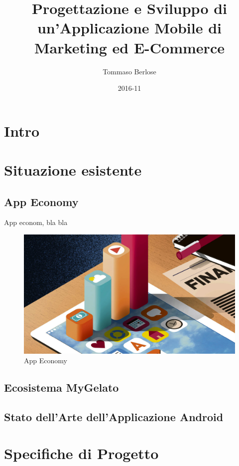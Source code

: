 \documentclass{article}
\title{Progettazione e Sviluppo di un'Applicazione Mobile di Marketing ed E-Commerce}
\date{2016-11}
\author{Tommaso Berlose}
\begin{document}
  \maketitle
  \newpage
  \tableofcontents
  \newpage
  
  \section*{Intro}
  \newpage
  \section{Situazione esistente}

  \subsection{App Economy}
  
  App econom, bla bla
  
  \begin{figure}[h!]
    \includegraphics[width=\linewidth]{images/The-App-Economy.jpg}
    \caption{App Economy}
    \label{fig:appEconomy1}
  \end{figure}

  \subsection{Ecosistema MyGelato}

  \subsection{Stato dell’Arte dell’Applicazione Android}
  \newpage
  \section{Specifiche di Progetto}
\end{document}
